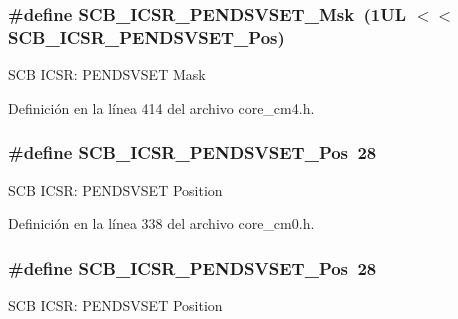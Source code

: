 \subsubsection[{\texorpdfstring{S\+C\+B\+\_\+\+I\+C\+S\+R\+\_\+\+P\+E\+N\+D\+S\+V\+S\+E\+T\+\_\+\+Msk}{SCB_ICSR_PENDSVSET_Msk}}]{\setlength{\rightskip}{0pt plus 5cm}\#define S\+C\+B\+\_\+\+I\+C\+S\+R\+\_\+\+P\+E\+N\+D\+S\+V\+S\+E\+T\+\_\+\+Msk~(1\+U\+L $<$$<$ S\+C\+B\+\_\+\+I\+C\+S\+R\+\_\+\+P\+E\+N\+D\+S\+V\+S\+E\+T\+\_\+\+Pos)}\hypertarget{group___c_m_s_i_s___s_c_b_ga1e40d93efb402763c8c00ddcc56724ff}{}\label{group___c_m_s_i_s___s_c_b_ga1e40d93efb402763c8c00ddcc56724ff}
S\+CB I\+C\+SR\+: P\+E\+N\+D\+S\+V\+S\+ET Mask 

Definición en la línea 414 del archivo core\+\_\+cm4.\+h.

\subsubsection[{\texorpdfstring{S\+C\+B\+\_\+\+I\+C\+S\+R\+\_\+\+P\+E\+N\+D\+S\+V\+S\+E\+T\+\_\+\+Pos}{SCB_ICSR_PENDSVSET_Pos}}]{\setlength{\rightskip}{0pt plus 5cm}\#define S\+C\+B\+\_\+\+I\+C\+S\+R\+\_\+\+P\+E\+N\+D\+S\+V\+S\+E\+T\+\_\+\+Pos~28}\hypertarget{group___c_m_s_i_s___s_c_b_gab5ded23d2ab1d5ff7cc7ce746205e9fe}{}\label{group___c_m_s_i_s___s_c_b_gab5ded23d2ab1d5ff7cc7ce746205e9fe}
S\+CB I\+C\+SR\+: P\+E\+N\+D\+S\+V\+S\+ET Position 

Definición en la línea 338 del archivo core\+\_\+cm0.\+h.

\subsubsection[{\texorpdfstring{S\+C\+B\+\_\+\+I\+C\+S\+R\+\_\+\+P\+E\+N\+D\+S\+V\+S\+E\+T\+\_\+\+Pos}{SCB_ICSR_PENDSVSET_Pos}}]{\setlength{\rightskip}{0pt plus 5cm}\#define S\+C\+B\+\_\+\+I\+C\+S\+R\+\_\+\+P\+E\+N\+D\+S\+V\+S\+E\+T\+\_\+\+Pos~28}\hypertarget{group___c_m_s_i_s___s_c_b_gab5ded23d2ab1d5ff7cc7ce746205e9fe}{}\label{group___c_m_s_i_s___s_c_b_gab5ded23d2ab1d5ff7cc7ce746205e9fe}
S\+CB I\+C\+SR\+: P\+E\+N\+D\+S\+V\+S\+ET Position 

